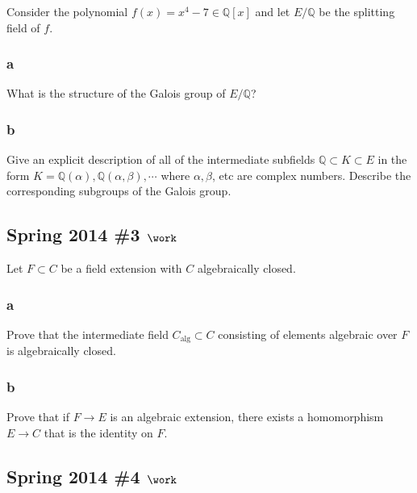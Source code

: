 Consider the polynomial \(f(x) = x^4 - 7 \in {\mathbb{Q}}[x]\) and let
\(E/{\mathbb{Q}}\) be the splitting field of \(f\).

\hypertarget{a-75}{%
\subsubsection{a}\label{a-75}}

What is the structure of the Galois group of \(E/{\mathbb{Q}}\)?

\hypertarget{b-65}{%
\subsubsection{b}\label{b-65}}

Give an explicit description of all of the intermediate subfields
\({\mathbb{Q}}\subset K \subset E\) in the form
\(K = {\mathbb{Q}}(\alpha), {\mathbb{Q}}(\alpha, \beta), \cdots\) where
\(\alpha, \beta\), etc are complex numbers. Describe the corresponding
subgroups of the Galois group.

\hypertarget{spring-2014-3-work}{%
\subsection{\texorpdfstring{Spring 2014 \#3
\(\work\)}{Spring 2014 \#3 \textbackslash work}}\label{spring-2014-3-work}}

Let \(F\subset C\) be a field extension with \(C\) algebraically closed.

\hypertarget{a-76}{%
\subsubsection{a}\label{a-76}}

Prove that the intermediate field \(C_{\text{alg}} \subset C\)
consisting of elements algebraic over \(F\) is algebraically closed.

\hypertarget{b-66}{%
\subsubsection{b}\label{b-66}}

Prove that if \(F\to E\) is an algebraic extension, there exists a
homomorphism \(E\to C\) that is the identity on \(F\).

\hypertarget{spring-2014-4-work}{%
\subsection{\texorpdfstring{Spring 2014 \#4
\(\work\)}{Spring 2014 \#4 \textbackslash work}}\label{spring-2014-4-work}}

